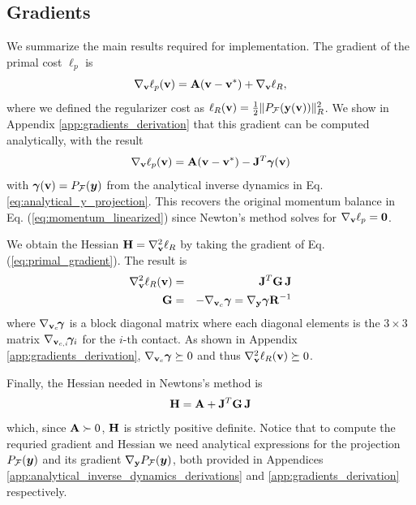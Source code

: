 \subsection{Gradients}
\label{sec:gradients}


We summarize the main results required for implementation. The gradient of the
primal cost $\ell_p$ is
\begin{equation}
	\nabla_{\mathbf{v}}\ell_p({\mathbf{v}}) = {\mathbf{A}}({\mathbf{v}}-{\mathbf{v}}^*) + \nabla_{\mathbf{v}}\ell_R,
\end{equation}
where we defined the regularizer cost as $\ell_R({\mathbf{v}})=\frac{1}{2}\Vert
P_\mathcal{F}({\mathbf{y}}({\mathbf{v}}))\Vert_R^2$. We show in Appendix
\ref{app:gradients_derivation} that this gradient can be computed analytically,
with the result
\begin{equation}
	\nabla_\mf{v}\ell_p(\mf{v}) = \mf{A}(\mf{v}-\mf{v}^*) - \mf{J}^T\bgamma(\mf{v})
	\label{eq:primal_gradient}
\end{equation}
with ${\bm\gamma}({\mathbf{v}})=P_\mathcal{F}({\bm{y}})$ from the analytical inverse
dynamics in Eq. \eqref{eq:analytical_y_projection}. This recovers the original
momentum balance in Eq. (\ref{eq:momentum_linearized}) since Newton's method
solves for $\nabla_{\mathbf{v}}\ell_p={\mathbf{0}}$.

We obtain the Hessian ${\mathbf{H}}=\nabla_{\mathbf{v}}^2\ell_R$ by taking the gradient of
Eq. (\ref{eq:primal_gradient}). The result is
\begin{eqnarray}
	\nabla_\mf{v}^2\ell_R(\mf{v}) &=& \mf{J}^T\mf{G}\,\mf{J}\nonumber\\
	\mf{G} &=&-\nabla_{\mf{v}_c}\bgamma = \nabla_\mf{y}\bgamma \mf{R}^{-1}
	\label{eq:ellR_hessian}
\end{eqnarray}
where $\nabla_{{\mathbf{v}}_c}\!{\bm\gamma}$ is a block diagonal matrix where each
diagonal elements is the $3\times 3$ matrix $\nabla_{{\mathbf{v}}_{c,i}}\!{\bm\gamma}_i$
for the $i\text{-th}$ contact. As shown in Appendix
\ref{app:gradients_derivation}, $\nabla_{{\mathbf{v}}_c}{\bm\gamma}\succeq 0$ and thus
$\nabla_{\mathbf{v}}^2\ell_R({\mathbf{v}})\succeq 0$.

Finally, the Hessian needed in Newtons's method is
\begin{equation}
	\mf{H}= \mf{A} + \mf{J}^T\mf{G}\,\mf{J}
	\label{eq:ell_hessian}
\end{equation}
which, since ${\mathbf{A}}\succ 0$, ${\mathbf{H}}$ is strictly positive definite. Notice
that to compute the requried gradient and Hessian we need analytical expressions
for the projection $P_\mathcal{F}({\bm{y}})$ and its gradient
$\nabla_{\mathbf{y}}P_\mathcal{F}({\bm{y}})$, both provided in Appendices
\ref{app:analytical_inverse_dynamics_derivations} and
\ref{app:gradients_derivation} respectively.

